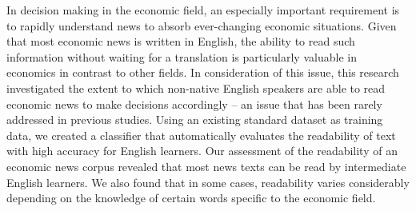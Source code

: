 In decision making in the economic field, an especially important requirement is to rapidly understand news to absorb ever-changing economic situations. Given that most economic news is written in English, the ability to read such information without waiting for a translation is particularly valuable in economics in contrast to other fields. In consideration of this issue, this research investigated the extent to which non-native English speakers are able to read economic news to make decisions accordingly -- an issue that has been rarely addressed in previous studies. Using an existing standard dataset as training data, we created a classifier that automatically evaluates the readability of text with high accuracy for English learners. Our assessment of the readability of an economic news corpus revealed that most news texts can be read by intermediate English learners. We also found that in some cases, readability varies considerably depending on the knowledge of certain words specific to the economic field.
